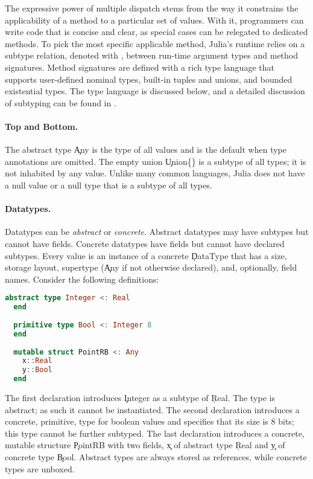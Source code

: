 The expressive power of multiple dispatch
stems from the way it constrains the applicability of a method to a
particular set of values.  With it, programmers can write code that is
concise and clear, as special cases can be relegated to dedicated methods.
To pick the most specific applicable method, Julia's runtime relies on a subtype
relation, denoted with \code{<:}, between run-time argument types and method signatures.
Method signatures are defined with a rich type language that supports
user-defined nominal types, built-in tuples and unions, and bounded existential types. 
The type language is discussed below, and a detailed discussion of subtyping can
be found in \cite{oopsla18b}.

\paragraph{Top and Bottom.} The abstract type \c{Any} is the
type of all values and is the default when type annotations are omitted.
The empty union \c{Union\{\}} is a subtype of all types; it is not
inhabited by any value.  Unlike many common languages, Julia does not have a
null value or a null type that is a subtype of all types.

\paragraph{Datatypes.} 
Datatypes can be \emph{abstract} or \emph{concrete}. Abstract datatypes may
have subtypes but cannot have fields. Concrete datatypes have fields but
cannot have declared subtypes.  Every value is an instance of a concrete
\c{DataType} that has a size, storage layout, supertype (\c{Any} if
not otherwise declared), and, optionally, field names.  Consider
the following definitions:
\begin{lstlisting}[language=julia]
  abstract type Integer <: Real
  end
  
  primitive type Bool <: Integer 8
  end
  
  mutable struct PointRB <: Any
    x::Real
    y::Bool
  end
\end{lstlisting}
\noindent The first declaration introduces \c{Integer} as a subtype of
\c{Real}. The type is abstract; as such it cannot be instantiated.  The
second declaration introduces a concrete, primitive, type for boolean values
and specifies that its size is 8 bits; this type cannot be further subtyped.
The last declaration introduces a concrete, mutable structure \c{PointRB} with two
fields, \c{x} of abstract type \c{Real} and \c{y} of concrete type
\c{Bool}.  Abstract types are always stored as references, while concrete
types are unboxed.


